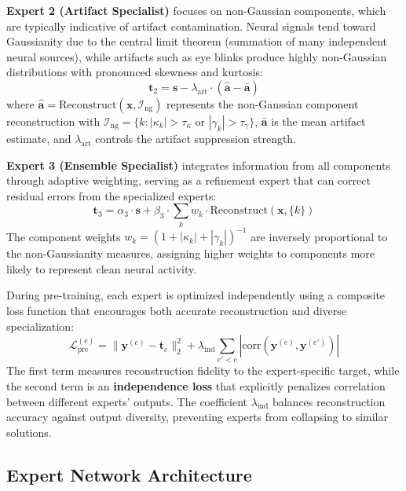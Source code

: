 \documentclass{article}
\begin{document}
\textbf{Expert 2 (Artifact Specialist)} focuses on non-Gaussian components, which are typically indicative of artifact contamination. Neural signals tend toward Gaussianity due to the central limit theorem (summation of many independent neural sources), while artifacts such as eye blinks produce highly non-Gaussian distributions with pronounced skewness and kurtosis:
\begin{equation}
\mathbf{t}_2 = \mathbf{s} - \lambda_{\text{art}} \cdot (\hat{\mathbf{a}} - \bar{\mathbf{a}})
\end{equation}
where $\hat{\mathbf{a}} = \text{Reconstruct}(\mathbf{x}, \mathcal{I}_{\text{ng}})$ represents the non-Gaussian component reconstruction with $\mathcal{I}_{\text{ng}} = \{k : |\kappa_k| > \tau_{\kappa} \text{ or } |\gamma_k| > \tau_{\gamma}\}$, $\bar{\mathbf{a}}$ is the mean artifact estimate, and $\lambda_{\text{art}}$ controls the artifact suppression strength.

\textbf{Expert 3 (Ensemble Specialist)} integrates information from all components through adaptive weighting, serving as a refinement expert that can correct residual errors from the specialized experts:
\begin{equation}
\mathbf{t}_3 = \alpha_3 \cdot \mathbf{s} + \beta_3 \cdot \sum_k w_k \cdot \text{Reconstruct}(\mathbf{x}, \{k\})
\end{equation}
The component weights $w_k = (1 + |\kappa_k| + |\gamma_k|)^{-1}$ are inversely proportional to the non-Gaussianity measures, assigning higher weights to components more likely to represent clean neural activity.

During pre-training, each expert is optimized independently using a composite loss function that encourages both accurate reconstruction and diverse specialization:
\begin{equation}
\mathcal{L}_{\text{pre}}^{(e)} = \|\mathbf{y}^{(e)} - \mathbf{t}_e\|_2^2 + \lambda_{\text{ind}} \sum_{e' < e} |\text{corr}(\mathbf{y}^{(e)}, \mathbf{y}^{(e')})|
\end{equation}
The first term measures reconstruction fidelity to the expert-specific target, while the second term is an \textbf{independence loss} that explicitly penalizes correlation between different experts' outputs. The coefficient $\lambda_{\text{ind}}$ balances reconstruction accuracy against output diversity, preventing experts from collapsing to similar solutions.

\subsection{Expert Network Architecture}
\end{document}
